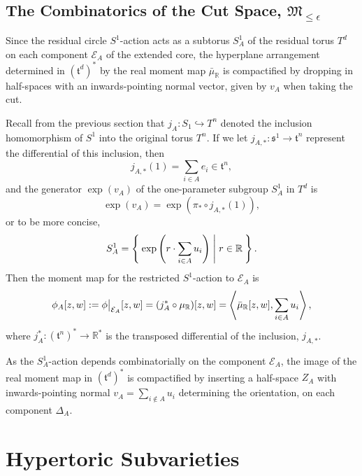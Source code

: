 \documentclass{article}
\newcommand{\ra}{\rightarrow}
\newcommand{\lbracket}{\left(}
\newcommand{\rbracket}{\right)}
\newcommand{\e}{\epsilon}
\newcommand{\RR}{\mathbb{R}}
\newcommand{\mcE}{\mathcal{E}}
\newcommand{\mft}{\mathfrak{t}}
\newcommand{\mc}[1]{\mathcal{#1}}
\newcommand{\mf}[1]{\mathfrak{#1}}
\newcommand{\mrr}{\mu_{\mathbb{R}}}
\newcommand\restr[2]{{%
		\left.\kern-\nulldelimiterspace %
		#1 %
		\vphantom{\big|} %
		\right|_{#2} %
}}
\begin{document}
	\subsection{The Combinatorics of the Cut Space, $\mf{M}_{\leq \e}$}
	
	Since the residual circle $S^{1}$-action acts as a subtorus $S_{A}^{1}$ of the residual torus $T^{d}$ on each component $\mc{E}_{A}$ of the extended core, the hyperplane arrangement determined in $(\mft^{d})^{\ast}$ by the real moment map $\bar{\mu}_{\RR}$ is compactified by dropping in half-spaces with an inwards-pointing normal vector, given by $v_{A}$ when taking the cut. 
	
	Recall from the previous section that $j_{A}: S_{1} \hookrightarrow T^{n}$ denoted the inclusion homomorphism of $S^{1}$ into the original torus $T^{n}$. If we let $j_{A, \ast}: \mf{s}^{1} \rightarrow \mft^{n}$ represent the differential of this inclusion, then
	\[
	j_{A,\ast}(1) = \sum_{i \in A} e_{i} \in \mft^{n},
	\]
	and the generator $\exp(v_{A})$ of the one-parameter subgroup $S_{A}^{1}$ in $T^{d}$ is
	\[
	\exp(v_{A}) = \exp\lbracket \pi_{\ast} \circ j_{A, \ast}(1) \rbracket,
	\]
	or to be more concise,
	\[
	S_{A}^{1} = \Set{ \exp \lbracket r \cdot \sum_{i \in A} u_{i} \rbracket | r \in \RR }.
	\]
	Then the moment map for the restricted $S^{1}$-action to $\mcE_{A}$ is
	\begin{equation*}
		\phi_{A}[z,w] := \restr{\phi}{\mcE_{A}} [z,w] =  (j_{A}^{\ast} \circ \mrr)[z,w] = \left\langle \bar{\mu}_{\RR}[z,w], \sum_{i\in A} u_{i} \right\rangle,
	\end{equation*}
	where $j_{A}^{\ast} : (\mft^{n})^{\ast} \ra \RR^{\ast}$ is the transposed differential of the inclusion, $j_{A, \ast}$.
	
	As the $S_{A}^{1}$-action depends combinatorially on the component $\mcE_{A}$, the image of the real moment map in $(\mft^{d})^{\ast}$ is compactified by inserting a half-space $Z_{A}$ with inwards-pointing normal $v_{A} = \sum_{i \not\in A}u_{i}$ determining the orientation, on each component $\Delta_{A}$.
	
	\section{Hypertoric Subvarieties}
	
	
	

	
	
	
	
	
	
	
	
	
	
	
	
	
	
	
	
	
	
	
	
	
	
	  
	
	
\end{document}

